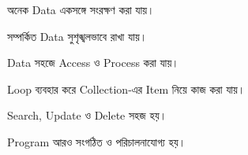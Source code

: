 

\begin{compacttwocolpoints}

\item অনেক Data একসঙ্গে সংরক্ষণ করা যায়।

\item সম্পর্কিত Data সুশৃঙ্খলভাবে রাখা যায়।

\item Data সহজে Access ও Process করা যায়।

\item Loop ব্যবহার করে Collection-এর Item নিয়ে কাজ করা যায়।

\item Search, Update ও Delete সহজ হয়।

\item Program আরও সংগঠিত ও পরিচালনাযোগ্য হয়।

\end{compacttwocolpoints}



